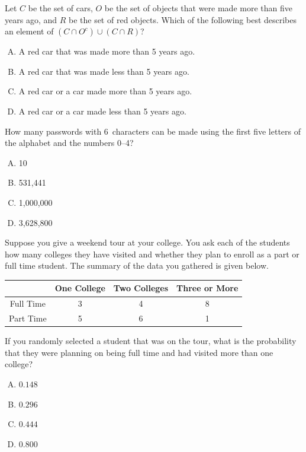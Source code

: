 \documentclass[12pt,letterpaper]{exam}
\begin{document}
\begin{questions}
\vfill

\question Let $C$ be the set of cars, $O$ be the set of objects that were made more than five years ago, and $R$ be the set of red objects. Which of the following best describes an element of $(C \cap O^c) \cup (C \cap R)$?
	\begin{enumerate}[A.]
	\item A red car that was made more than 5 years ago.
	\item A red car that was made less than 5 years ago.
	\item A red car or a car made more than 5 years ago.
	\item A red car or a car made less than 5 years ago.
	\end{enumerate}

\vfill

\question How many passwords with 6~characters can be made using the first five letters of the alphabet and the numbers 0--4?
	\begin{enumerate}[A.]
	\item 10
	\item 531,441
	\item 1,000,000
	\item 3,628,800
	\end{enumerate}

\vfill

\question Suppose you give a weekend tour at your college. You ask each of the students how many colleges they have visited and whether they plan to enroll as a part or full time student. The summary of the data you gathered is given below. \par
	\begin{table}[H]
	\centering
	\begin{tabular}{|c|c|c|c|} \hline
	& One College & Two Colleges & Three or More \\ \hline
	Full Time & 3 & 4 & 8 \\ \hline
	Part Time & 5 & 6 & 1 \\ \hline
	\end{tabular}
	\end{table} \par
If you randomly selected a student that was on the tour, what is the probability that they were planning on being full time and had visited more than one college?
	\begin{enumerate}[A.]
	\item $0.148$
	\item $0.296$
	\item $0.444$
	\item $0.800$
	\end{enumerate}


\end{questions}
\end{document}

